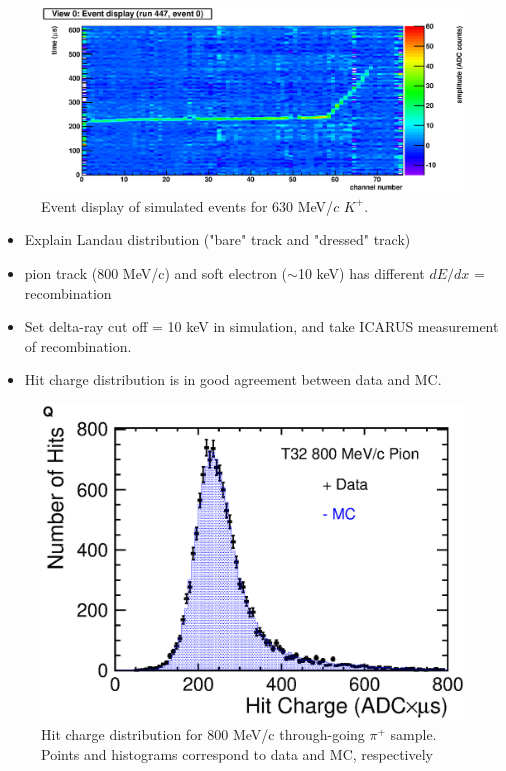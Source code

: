 \begin{figure}[htbp]
 \begin{center}
  \includegraphics[width=0.8\hsize]{fig/Simulation.eps}
 \end{center}
 \caption{Event display of simulated events for 630 MeV/$c$ $K^+$.}
 \label{Fig:SimulatedKaon}
\end{figure}

\begin{itemize}
\item Explain Landau distribution ("bare" track and "dressed" track)
\item pion track (800 MeV/c) and soft electron ($\sim$10 keV) has different $dE/dx$ = recombination
\item Set delta-ray cut off = 10 keV in simulation, and take ICARUS measurement of recombination.
\item Hit charge distribution is in good agreement between data and MC.
\end{itemize}

\begin{figure}[htbp]
 \begin{center}
  \includegraphics[width=0.8\hsize]{fig/PionLandau.eps}
 \end{center}
 \caption{Hit charge distribution for 800 MeV/c through-going $\pi^+$ sample. Points and histograms correspond to data and MC, respectively}
 \label{Fig:PionLandau}
\end{figure}


%
